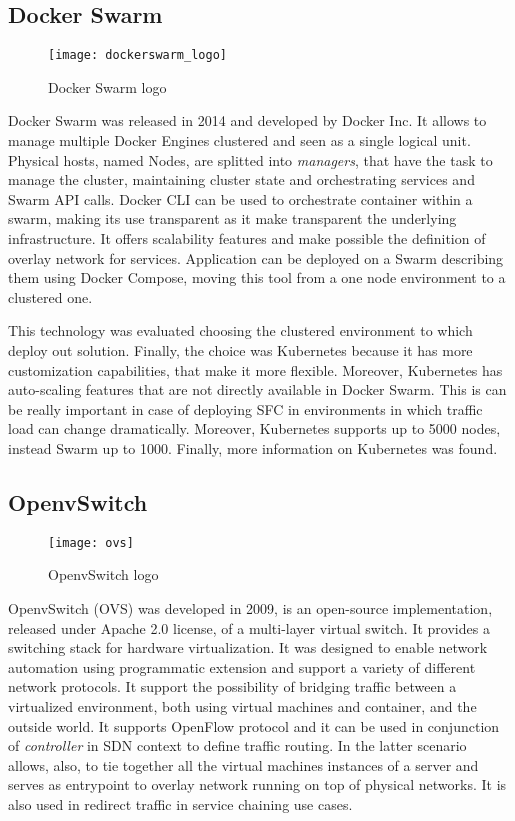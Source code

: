 \subsection{Docker Swarm}
\begin{figure}[t]
  \centering \texttt{[image: dockerswarm\_logo]}
  \caption{Docker Swarm logo}
  \label{chap:intro:img:docker_logo}
\end{figure}
Docker Swarm was released in 2014 and developed by Docker Inc. It allows to
manage multiple Docker Engines clustered and seen as a single logical unit.
Physical hosts, named Nodes, are splitted into \emph{managers}, that have the
task to manage the cluster, maintaining cluster state and orchestrating services
and Swarm API calls. Docker CLI can be used to orchestrate container within a
swarm, making its use transparent as it make transparent the underlying
infrastructure. It offers scalability features and make possible the definition
of overlay network for services. Application can be deployed on a Swarm
describing them using Docker Compose, moving this tool from a one node
environment to a clustered one.

This technology was evaluated choosing the clustered environment to which deploy
out solution. Finally, the choice was Kubernetes because it has more
customization capabilities, that make it more flexible. Moreover, Kubernetes has
auto-scaling features that are not directly available in Docker Swarm. This is
can be really important in case of deploying SFC in environments in which
traffic load can change dramatically. Moreover, Kubernetes supports up to 5000
nodes, instead Swarm up to 1000. Finally, more information on Kubernetes was
found.

\subsection{OpenvSwitch}
\begin{figure}[h]
 \centering \texttt{[image: ovs]}
 \caption{OpenvSwitch logo}
 \label{chap:prjan:img:ovs_logo}
\end{figure}
OpenvSwitch (OVS) was developed in 2009, is an open-source implementation,
released under Apache 2.0 license, of a multi-layer virtual switch. It provides
a switching stack for hardware virtualization. It was designed to enable network
automation using programmatic extension and support a variety of different
network protocols. It support the possibility of bridging traffic between a
virtualized environment, both using virtual machines and container, and the
outside world. It supports OpenFlow protocol and it can be used in conjunction
of \emph{controller} in SDN context to define traffic routing. In the latter
scenario allows, also, to tie together all the virtual machines instances of a
server and serves as entrypoint to overlay network running on top of physical
networks. It is also used in redirect traffic in service chaining use cases.

